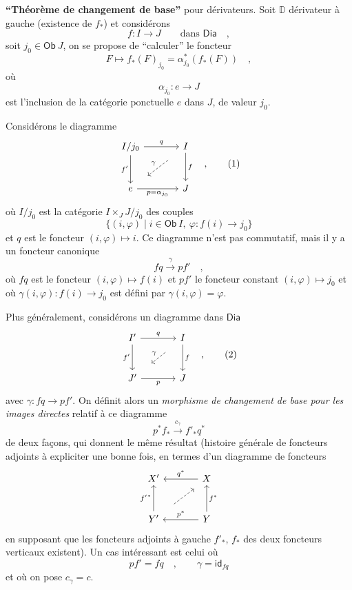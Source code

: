 \documentclass[11pt]{article}
\newcommand{\printedpage}[1]{\marginpar{\footnotesize p.~#1}}
\newcommand{\msp}[1]{\marginpar{\footnotesize [#1]}}
\newcommand{\DD}{\mathbb{D}}
\newcommand{\sDia}{\mathsf{Dia}}
\newcommand{\sOb}{\mathsf{Ob}}
\newcommand{\sid}{\mathsf{id}}
\begin{document}
\textbf{“Théorème de changement de base”} pour dérivateurs. Soit $\DD$ dérivateur à gauche (existence de $f_*$) et considérons
\[ f : I \longrightarrow J \qquad \text{dans } \sDia \quad , \]
soit $j_0 \in \sOb\ J$, on se propose de “calculer” le foncteur
\[ F \mapsto f_*(F)_{j_0} = \alpha^*_{j_0}(f_*(F)) \quad , \]
où
\[ \alpha_{j_0} : e \longrightarrow J \]
est l'inclusion de la catégorie ponctuelle $e$ dans $J$, de valeur $j_0$.

\msp{page 30}
Considérons le diagramme
\[
\begin{tikzcd}[row sep=large, column sep=large]
I/j_0 \arrow[r, "q"] \arrow[d, "f'"'] & I \arrow[d, "f"] \\
e \arrow[r, "p = \alpha_{j_0}"'] & J
\arrow[from=1-2, to=2-1, dashed, shorten <=14pt, shorten >=14pt, "\gamma"']
\end{tikzcd}
\quad ,
\tag*{(1)}
\]
où $I/j_0$ est la catégorie $I \times_J J/j_0$ des couples
\[ \{(i,\varphi) \mid i \in \sOb\ I,\ \varphi : f(i) \to j_0\} \]
et $q$ est le foncteur $(i,\varphi) \mapsto i$. Ce diagramme n'est pas commutatif, mais il y a un foncteur canonique
\[ fq \xrightarrow{\gamma} pf' \quad , \]
où $fq$ est le foncteur $(i,\varphi) \mapsto f(i)$ et $pf'$ le foncteur constant $(i,\varphi) \mapsto j_0$ et où $\gamma(i,\varphi) : f(i) \to j_0$ est défini par $\gamma(i,\varphi) = \varphi$.

Plus généralement, considérons un diagramme dans $\sDia$
\[
\begin{tikzcd}[row sep=large, column sep=large]
I' \arrow[r, "q"] \arrow[d, "f'"'] & I \arrow[d, "f"] \\
J' \arrow[r, "p"'] & J
\arrow[from=1-2, to=2-1, dashed, shorten <=14pt, shorten >=14pt, "\gamma"']
\end{tikzcd}
\quad ,
\tag*{(2)}
\]
\printedpage{21}
avec $\gamma : fq \to pf'$. On définit alors un \textit{morphisme de changement de base pour les images directes} relatif à ce diagramme
\[ p^* f_* \xrightarrow{c_\gamma} f'_* q^* \]
\msp{page 31}
de deux façons, qui donnent le même résultat (histoire générale de foncteurs adjoints à expliciter une bonne fois, en termes d'un diagramme de foncteurs
\[
\begin{tikzcd}[row sep=large, column sep=large]
X' & X \arrow[l, "q^*"'] \\
Y' \arrow[u, "{f'}^*"] & Y \arrow[l, "p^*"'] \arrow[u, "f^*"']
\arrow[from=2-1, to=1-2, dashed, shorten <=14pt, shorten >=6pt]
\end{tikzcd}
\]
en supposant que les foncteurs adjoints à gauche $f'_*$, $f_*$ des deux foncteurs verticaux existent). Un cas intéressant est celui où
\[ pf' = fq \quad , \qquad \gamma = \sid_{fq} \]
et où on pose $c_\gamma = c$.
\end{document}
